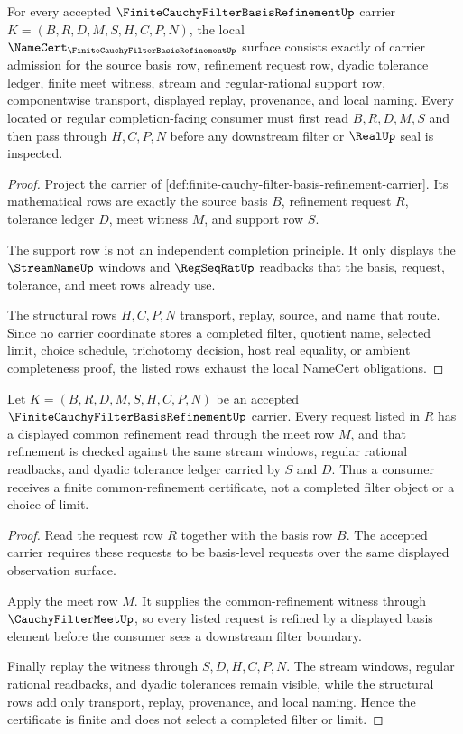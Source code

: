 \begin{theorem}
\label{thm:finite-cauchy-filter-basis-refinement-namecert-obligations}
For every accepted $\FiniteCauchyFilterBasisRefinementUp$ carrier $K=(B,R,D,M,S,H,C,P,N)$, the local $\NameCert_{\FiniteCauchyFilterBasisRefinementUp}$ surface consists exactly of carrier admission for the source basis row, refinement request row, dyadic tolerance ledger, finite meet witness, stream and regular-rational support row, componentwise transport, displayed replay, provenance, and local naming. Every located or regular completion-facing consumer must first read $B,R,D,M,S$ and then pass through $H,C,P,N$ before any downstream filter or $\RealUp$ seal is inspected.
\end{theorem}
\begin{proof}
Project the carrier of \autoref{def:finite-cauchy-filter-basis-refinement-carrier}. Its mathematical rows are exactly the source basis $B$, refinement request $R$, tolerance ledger $D$, meet witness $M$, and support row $S$.

The support row is not an independent completion principle. It only displays the $\StreamNameUp$ windows and $\RegSeqRatUp$ readbacks that the basis, request, tolerance, and meet rows already use.

The structural rows $H,C,P,N$ transport, replay, source, and name that route. Since no carrier coordinate stores a completed filter, quotient name, selected limit, choice schedule, trichotomy decision, host real equality, or ambient completeness proof, the listed rows exhaust the local NameCert obligations.
\end{proof}

\begin{theorem}
\label{thm:finite-cauchy-filter-basis-refinement-common-refinement}
Let $K=(B,R,D,M,S,H,C,P,N)$ be an accepted $\FiniteCauchyFilterBasisRefinementUp$ carrier. Every request listed in $R$ has a displayed common refinement read through the meet row $M$, and that refinement is checked against the same stream windows, regular rational readbacks, and dyadic tolerance ledger carried by $S$ and $D$. Thus a consumer receives a finite common-refinement certificate, not a completed filter object or a choice of limit.
\end{theorem}
\begin{proof}
Read the request row $R$ together with the basis row $B$. The accepted carrier requires these requests to be basis-level requests over the same displayed observation surface.

Apply the meet row $M$. It supplies the common-refinement witness through $\CauchyFilterMeetUp$, so every listed request is refined by a displayed basis element before the consumer sees a downstream filter boundary.

Finally replay the witness through $S,D,H,C,P,N$. The stream windows, regular rational readbacks, and dyadic tolerances remain visible, while the structural rows add only transport, replay, provenance, and local naming. Hence the certificate is finite and does not select a completed filter or limit.
\end{proof}

